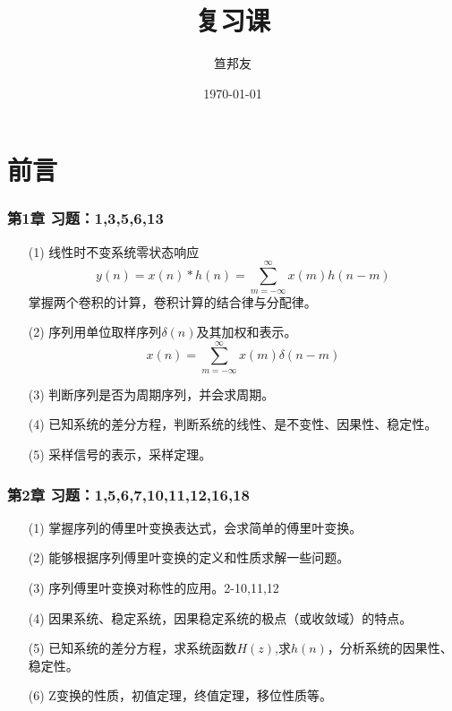 \documentclass[notheorems,compress,mathserif,table]{beamer}
\title{\heiti 复习课}
\author[\textcolor{blue}]{{\sihao\kaishu  笪邦友}}
\institute{\sihao\lishu  \textcolor{violet}{中南民族大学~~ 电子信息工程学院}}
\date{\fangsong\today}
\newtheorem{dablock}{}
\begin{document}
\kaishu
\frame{ \titlepage }
\section*{前言}


\begin{frame}[shrink]\frametitle{第1章  \quad 习题：1,3,5,6,13  }%
\begin{enumerate}
	\item [(1)] 线性时不变系统零状态响应$$ y(n)= x(n)*h(n)= \sum_{m=-\infty}^{\infty}x(m)h(n-m) $$ 
		掌握两个卷积的计算，卷积计算的结合律与分配律。
	\item [(2)] 序列用单位取样序列$\delta(n) $及其加权和表示。
		$$ x(n) = \sum_{m=-\infty}^{\infty}x(m) \delta (n-m) $$
 	\item [(3)] 判断序列是否为周期序列，并会求周期。
	\item [(4)] 已知系统的差分方程，判断系统的线性、是不变性、因果性、稳定性。
    \item [(5)] 采样信号的表示，采样定理。
\end{enumerate}

\end{frame}
%
%
%
\begin{frame}[shrink]\frametitle{第2章  \quad 习题：1,5,6,7,10,11,12,16,18  }%
\begin{enumerate}
	\item [(1)] 掌握序列的傅里叶变换表达式，会求简单的傅里叶变换。
	\item [(2)] 能够根据序列傅里叶变换的定义和性质求解一些问题。
	\item [(3)] 序列傅里叶变换对称性的应用。2-10,11,12
	\item [(4)] 因果系统、稳定系统，因果稳定系统的极点（或收敛域）的特点。
	\item [(5)] 已知系统的差分方程，求系统函数$ H(z) $,求$ h(n) $，分析系统的因果性、稳定性。
	\item [(6)] Z变换的性质，初值定理，终值定理，移位性质等。
\end{enumerate}

\end{frame}
\end{document}
